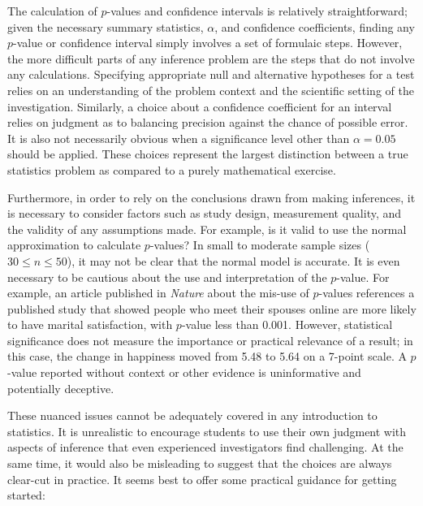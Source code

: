 The calculation of $p$-values and confidence intervals is relatively straightforward; given the necessary summary statistics, $\alpha$, and confidence coefficients, finding any $p$-value or confidence interval simply involves a set of formulaic steps. However, the more difficult parts of any inference problem are the steps that do not involve any calculations. Specifying appropriate null and alternative hypotheses for a test relies on an understanding of the problem context and the scientific setting of the investigation. Similarly, a choice about a confidence coefficient for an interval relies on judgment as to balancing precision against the chance of possible error. It is also not necessarily obvious when a significance level other than $\alpha = 0.05$ should be applied. These choices represent the largest distinction between a true statistics problem as compared to a purely mathematical exercise. 

Furthermore, in order to rely on the conclusions drawn from making inferences, it is necessary to consider factors such as study design, measurement quality, and the validity of any assumptions made. For example, is it valid to use the normal approximation to calculate $p$-values? In small to moderate sample sizes ($30 \leq n \leq 50$), it may not be clear that the normal model is accurate. It is even necessary to be cautious about the use and interpretation of the $p$-value. For example, an article published in \textit{Nature} about the mis-use of $p$-values references a published study that showed people who meet their spouses online are more likely to have marital satisfaction, with $p$-value less than 0.001. However, statistical significance does not measure the importance or practical relevance of a result; in this case, the change in happiness moved from 5.48 to 5.64 on a 7-point scale. A $p$-value reported without context or other evidence is uninformative and potentially deceptive.


These nuanced issues cannot be adequately covered in any introduction to statistics. It is unrealistic to encourage students to use their own judgment with aspects of inference that even experienced investigators find challenging. At the same time, it would also be misleading to suggest that the choices are always clear-cut in practice. It seems best to offer some practical guidance for getting started:

